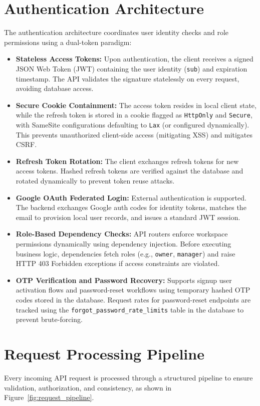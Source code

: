 \section{Authentication Architecture}
The authentication architecture coordinates user identity checks and role permissions using a dual-token paradigm:
\begin{itemize}
    \item \textbf{Stateless Access Tokens:} Upon authentication, the client receives a signed JSON Web Token (JWT) containing the user identity (\texttt{sub}) and expiration timestamp. The API validates the signature statelessly on every request, avoiding database access.
    \item \textbf{Secure Cookie Containment:} The access token resides in local client state, while the refresh token is stored in a cookie flagged as \texttt{HttpOnly} and \texttt{Secure}, with SameSite configurations defaulting to \texttt{Lax} (or configured dynamically). This prevents unauthorized client-side access (mitigating XSS) and mitigates CSRF.
    \item \textbf{Refresh Token Rotation:} The client exchanges refresh tokens for new access tokens. Hashed refresh tokens are verified against the database and rotated dynamically to prevent token reuse attacks.
    \item \textbf{Google OAuth Federated Login:} External authentication is supported. The backend exchanges Google auth codes for identity tokens, matches the email to provision local user records, and issues a standard JWT session.
    \item \textbf{Role-Based Dependency Checks:} API routers enforce workspace permissions dynamically using dependency injection. Before executing business logic, dependencies fetch roles (e.g., \texttt{owner}, \texttt{manager}) and raise HTTP 403 Forbidden exceptions if access constraints are violated.
    \item \textbf{OTP Verification and Password Recovery:} Supports signup user activation flows and password-reset workflows using temporary hashed OTP codes stored in the database. Request rates for password-reset endpoints are tracked using the \texttt{forgot\_password\_rate\_limits} table in the database to prevent brute-forcing.
\end{itemize}

\section{Request Processing Pipeline}
Every incoming API request is processed through a structured pipeline to ensure validation, authorization, and consistency, as shown in Figure~\ref{fig:request_pipeline}.

